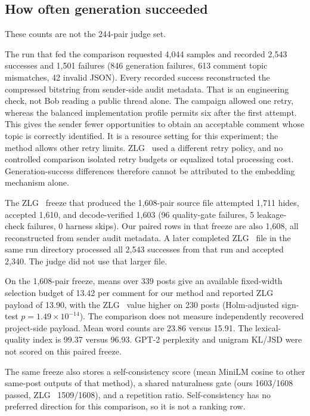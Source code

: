
\FloatBarrier

\subsection{How often generation succeeded}

These counts are not the 244-pair judge set.

The run that fed the comparison requested 4{,}044 samples and recorded 2{,}543 successes and 1{,}501 failures (846 generation failures, 613 comment topic mismatches, 42 invalid JSON).
Every recorded success reconstructed the compressed bitstring from sender-side audit metadata.
That is an engineering check, not Bob reading a public thread alone.
\label{par:baseline-retries}
The campaign allowed one retry, whereas the balanced implementation profile permits six after the first attempt. This gives the sender fewer opportunities to obtain an acceptable comment whose topic is correctly identified. It is a resource setting for this experiment; the method allows other retry limits. ZLG~\cite{lin2024zero} used a different retry policy, and no controlled comparison isolated retry budgets or equalized total processing cost. Generation-success differences therefore cannot be attributed to the embedding mechanism alone.

The ZLG~\cite{lin2024zero} freeze that produced the 1{,}608-pair source file attempted 1{,}711 hides, accepted 1{,}610, and decode-verified 1{,}603 (96 quality-gate failures, 5 leakage-check failures, 0 harness skips).
Our paired rows in that freeze are also 1{,}608, all reconstructed from sender audit metadata.
A later completed ZLG~\cite{lin2024zero} file in the same run directory processed all 2{,}543 successes from that run and accepted 2{,}340.
The judge did not use that larger file.

On the 1{,}608-pair freeze, means over 339 posts give an available fixed-width selection budget of 13.42 per comment for our method and reported ZLG~\cite{lin2024zero} payload of 13.90, with the ZLG~\cite{lin2024zero} value higher on 230 posts (Holm-adjusted sign-test $p=1.49\times 10^{-14}$). The comparison does not measure independently recovered project-side payload.
Mean word counts are 23.86 versus 15.91.
The lexical-quality index is 99.37 versus 96.93.
GPT-2 perplexity and unigram KL/JSD were not scored on this paired freeze.

The same freeze also stores a self-consistency score (mean MiniLM cosine to other same-post outputs of that method), a shared naturalness gate (ours 1603/1608 passed, ZLG~\cite{lin2024zero} 1509/1608), and a repetition ratio.
Self-consistency has no preferred direction for this comparison, so it is not a ranking row.


